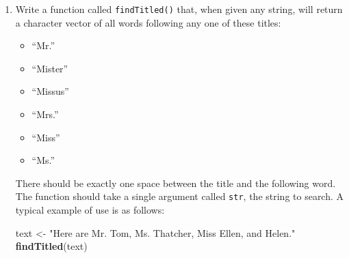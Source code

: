 \documentclass[]{book}
\makeatletter
\newenvironment{Shaded}{\begin{snugshade}}{\end{snugshade}}
\newcommand{\KeywordTok}[1]{\textcolor[rgb]{0.13,0.29,0.53}{\textbf{#1}}}
\newcommand{\StringTok}[1]{\textcolor[rgb]{0.31,0.60,0.02}{#1}}
\newcommand{\NormalTok}[1]{#1}
\providecommand{\tightlist}{%
  \setlength{\itemsep}{0pt}\setlength{\parskip}{0pt}}
\newenvironment{kframe}{%
\medskip{}
\setlength{\fboxsep}{.8em}
 \def\at@end@of@kframe{}%
 \ifinner\ifhmode%
  \def\at@end@of@kframe{\end{minipage}}%
  \begin{minipage}{\columnwidth}%
 \fi\fi%
 \def\FrameCommand##1{\hskip\@totalleftmargin \hskip-\fboxsep
 \colorbox{shadecolor}{##1}\hskip-\fboxsep
     \hskip-\linewidth \hskip-\@totalleftmargin \hskip\columnwidth}%
 \MakeFramed {\advance\hsize-\width
   \@totalleftmargin\z@ \linewidth\hsize
   \@setminipage}}%
 {\par\unskip\endMakeFramed%
 \at@end@of@kframe}
\renewenvironment{Shaded}{\begin{kframe}}{\end{kframe}}
\theoremstyle{definition}
\theoremstyle{definition}
\theoremstyle{definition}
\theoremstyle{remark}
\makeatother
\begin{document}
{\begin{enumerate}
  \begin{itemize}
  \tightlist
  \item
    \emph{box} and \emph{bat}. Regex string: \texttt{"b{[}oa{]}t"}.
    (This is the one to submit, because it's shorter than other
    alternatives such as\texttt{"box\textbar{}bat"}).
  \item
    \emph{cart} and \emph{cars} and \emph{carp}.
  \item
    \emph{slick} and \emph{sick}
  \item
    Any word ending in \emph{ity} (such as \emph{velocity} and
    \emph{ferocity}). Be sure to pay attention to word-boundaries. You
    should match \emph{velocity} but not \emph{~velocity} (includes a
    space before the ``v'') or \emph{velocity;}.
  \item
    A whole number consisting of more than six digits.
  \item
    A word that is between 3 and 6 characters long. Pay attention to
    word-boundaries.
  \item
    One or more whitespace characters, followed by a hyphen or a
    semicolon or a colon.
  \end{itemize}
\item
  Write a function called \texttt{findTitled()} that, when given any
  string, will return a character vector of all words following any one
  of these titles:

  \begin{itemize}
  \tightlist
  \item
    ``Mr.''
  \item
    ``Mister''
  \item
    ``Missus''
  \item
    ``Mrs.''
  \item
    ``Miss''
  \item
    ``Ms.''
  \end{itemize}

  There should be exactly one space between the title and the following
  word. The function should take a single argument called \texttt{str},
  the string to search. A typical example of use is as follows:

\begin{Shaded}
\begin{Highlighting}[]
\NormalTok{text <-}\StringTok{ "Here are Mr. Tom, Ms. Thatcher, Miss Ellen, and Helen."}
\KeywordTok{findTitled}\NormalTok{(text)}
\end{Highlighting}
\end{Shaded}


\end{enumerate}}
\end{document}
